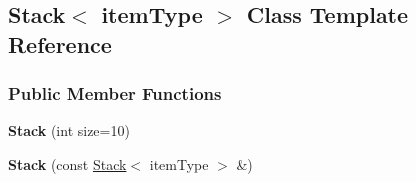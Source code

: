 \hypertarget{class_stack}{}\subsection{Stack$<$ item\+Type $>$ Class Template Reference}
\label{class_stack}
\subsubsection*{Public Member Functions}
\begin{DoxyCompactItemize}
\item 
{\bfseries Stack} (int size=10)\hypertarget{class_stack_a17f8469c3c765f436b4b6defa24a0364}{}\label{class_stack_a17f8469c3c765f436b4b6defa24a0364}

\item 
{\bfseries Stack} (const \hyperlink{class_stack}{Stack}$<$ item\+Type $>$ \&)\hypertarget{class_stack_acf76ef327f8d9ef2e9cda44b053b03e2}{}\label{class_stack_acf76ef327f8d9ef2e9cda44b053b03e2}


\end{DoxyCompactItemize}
